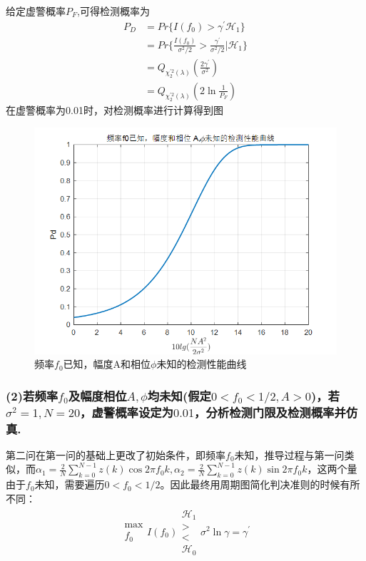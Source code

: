\documentclass[fontset=windows]{article}
\numberwithin{figure}{section}
\begin{document}
给定虚警概率\(P_F\),可得检测概率为
\begin{align*}
	P_D & =Pr\{I(f_0)>\gamma^{\prime}\mathcal{H}_1\}                                        \\
	    & =Pr\{\frac{I(f_0)}{\sigma^2/2}>\frac{\gamma^{\prime}}{\sigma^2/2}|\mathcal{H}_1\} \\
	    & =Q_{\chi^{\prime2}_2(\lambda)}(\frac{2\gamma^{\prime}}{\sigma^2})                 \\
	    & =Q_{\chi^{\prime2}_2(\lambda)}(2\ln \frac{1}{P_F})
\end{align*}
在虚警概率为0.01时，对检测概率进行计算得到图

\begin{figure}[H]
	\centering
	\includegraphics[scale=0.7]{4.1.png}
	\caption{频率\(f_0\)已知，幅度A和相位\(\phi\)未知的检测性能曲线}
	\label{5.4.1}
\end{figure}

\subsubsection*{(2)若频率\(f_0\)及幅度相位\(A,\phi \)均未知(假定\(0<f_0<1/2,A>0\))，若\(\sigma^2=1,N=20\)，虚警概率设定为\(0.01\)，分析检测门限及检测概率并仿真.}

第二问在第一问的基础上更改了初始条件，即频率\(f_0\)未知，推导过程与第一问类似，而\(\alpha_1=\frac{2}{N}\sum_{k=0}^{N-1}z(k)\cos 2\pi f_0k,\alpha_2=\frac{2}{N}\sum_{k=0}^{N-1}z(k)\sin 2\pi f_0k\)，这两个量由于\(f_0\)未知，需要遍历\(0<f_0<1/2\)。因此最终用周期图简化判决准则的时候有所不同：
\begin{align*}
	\begin{matrix}
		\max \\f_0
	\end{matrix}
	I(f_0)
	\begin{matrix}
		\mathcal{H}_1 \\
		>             \\
		<             \\
		\mathcal{H}_0
	\end{matrix}
	\sigma^2 \ln \gamma=\gamma^{\prime}
\end{align*}
\end{document}
